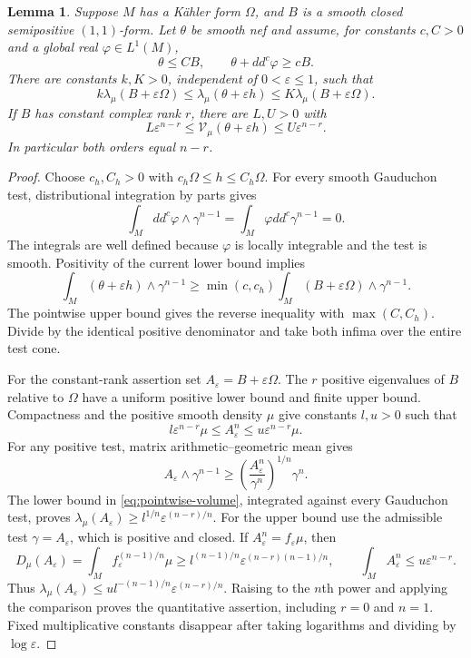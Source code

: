 \documentclass[11pt]{article}
\newtheorem{lemma}{Lemma}
\newcommand{\ddc}{dd^c}
\newcommand{\V}{\mathcal V}
\begin{document}
\begin{lemma}\label{lem:sandwich}
Suppose $M$ has a K\"ahler form $\Omega$, and $B$ is a smooth
closed semipositive $(1,1)$-form. Let $\theta$ be smooth nef and
assume, for constants $c,C>0$ and a global real $\varphi\in L^1(M)$,
\[
 \theta\leq CB,\qquad \theta+\ddc\varphi\geq cB.
\]
There are constants $k,K>0$, independent of $0<\varepsilon\leq1$,
such that
\[
 k\lambda_\mu(B+\varepsilon\Omega)
 \leq\lambda_\mu(\theta+\varepsilon h)
 \leq K\lambda_\mu(B+\varepsilon\Omega).
\]
If $B$ has constant complex rank $r$, there are $L,U>0$ with
\[
 L\varepsilon^{n-r}\leq\V_\mu(\theta+\varepsilon h)
                  \leq U\varepsilon^{n-r}.
\]
In particular both orders equal $n-r$.
\end{lemma}
\begin{proof}
Choose $c_h,C_h>0$ with $c_h\Omega\leq h\leq C_h\Omega$.
For every smooth Gauduchon test, distributional integration by parts
gives
\[
 \int_M\ddc\varphi\wedge\gamma^{n-1}
       =\int_M\varphi\ddc\gamma^{n-1}=0.
\]
The integrals are well defined because $\varphi$ is locally integrable
and the test is smooth. Positivity of the current lower bound implies
\[
 \int_M(\theta+\varepsilon h)\wedge\gamma^{n-1}
 \geq\min(c,c_h)\int_M(B+\varepsilon\Omega)
                                      \wedge\gamma^{n-1}.
\]
The pointwise upper bound gives the reverse inequality with
$\max(C,C_h)$. Divide by the identical positive denominator and
take both infima over the entire test cone.

For the constant-rank assertion set $A_\varepsilon=B+\varepsilon\Omega$.
The $r$ positive eigenvalues of $B$ relative to $\Omega$ have a
uniform positive lower bound and finite upper bound. Compactness and
the positive smooth density $\mu$ give constants $l,u>0$ such that
\begin{equation}\label{eq:pointwise-volume}
 l\varepsilon^{n-r}\mu\leq A_\varepsilon^n
                         \leq u\varepsilon^{n-r}\mu.
\end{equation}
For any positive test, matrix arithmetic--geometric mean gives
\[
 A_\varepsilon\wedge\gamma^{n-1}
 \geq\left(\frac{A_\varepsilon^n}{\gamma^n}\right)^{1/n}
                                                      \gamma^n.
\]
The lower bound in \eqref{eq:pointwise-volume}, integrated against
every Gauduchon test, proves
$\lambda_\mu(A_\varepsilon)\geq
 l^{1/n}\varepsilon^{(n-r)/n}$.
For the upper bound use the admissible test $\gamma=A_\varepsilon$,
which is positive and closed. If $A_\varepsilon^n=f_\varepsilon\mu$,
then
\[
 D_\mu(A_\varepsilon)=\int_Mf_\varepsilon^{(n-1)/n}\mu
 \geq l^{(n-1)/n}\varepsilon^{(n-r)(n-1)/n},
 \qquad \int_M A_\varepsilon^n\leq u\varepsilon^{n-r}.
\]
Thus $\lambda_\mu(A_\varepsilon)\leq
 ul^{-(n-1)/n}\varepsilon^{(n-r)/n}$. Raising to the $n$th power
and applying the comparison proves the quantitative assertion,
including $r=0$ and $n=1$. Fixed multiplicative constants disappear
after taking logarithms and dividing by $\log\varepsilon$.
\end{proof}
\end{document}

